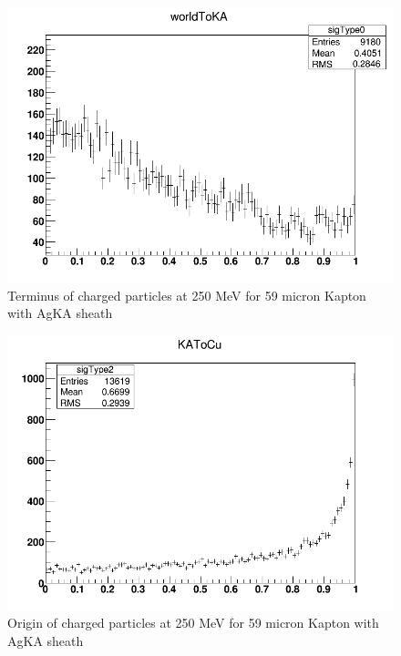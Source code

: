 \documentclass{article}
\begin{document}
\begin{figure}[H]
\centering
\includegraphics[width=6in]{figures/Cu_KA_AgKA_vac/S59/WorldtoKA.png}
\caption{Terminus of charged particles at 250 MeV for 59 micron Kapton with AgKA sheath}
\label{fig:G4_stats_AgKA_vac_a}
\end{figure}

\begin{figure}[H]
\centering
\includegraphics[width=6in]{figures/Cu_KA_AgKA_vac/S59/KAtoCu.png}
\caption{Origin of charged particles at 250 MeV for 59 micron Kapton with AgKA sheath}
\label{fig:G4_stats_AgKA_vac_b}
\end{figure}
\end{document}
